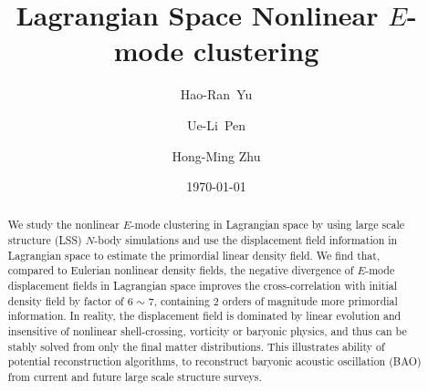 \documentclass[aps,prd,twocolumn,superscriptaddress,amsfont,amssymb,amsmath,nofootinbib,showpacs,balancelastpage]{revtex4-1}
\begin{document}
\addtolength{\hoffset}{-0.525cm}
\addtolength{\textwidth}{1.05cm}
\title{Lagrangian Space Nonlinear $E$-mode clustering}

\author{Hao-Ran~Yu}%

\author{Ue-Li~Pen}%

\author{Hong-Ming Zhu}%

\date{\today}

\begin{abstract}
We study the nonlinear $E$-mode clustering in Lagrangian space
by using large scale structure (LSS) $N$-body simulations
and use the displacement field information in Lagrangian space
to estimate the primordial linear density field.
We find that, compared to Eulerian nonlinear density fields,
the negative divergence of $E$-mode displacement fields
in Lagrangian space improves the cross-correlation with
initial density field by factor of 6 $\sim$ 7,
containing 2 orders of magnitude more primordial information. 
In reality, the displacement field is dominated by linear evolution
and insensitive of nonlinear shell-crossing, vorticity or
baryonic physics, and thus can be stably solved from only
the final matter distributions.
This illustrates ability of potential reconstruction algorithms,
to reconstruct baryonic acoustic oscillation (BAO) 
from current and future large scale structure surveys.


\end{abstract}
\end{document}
